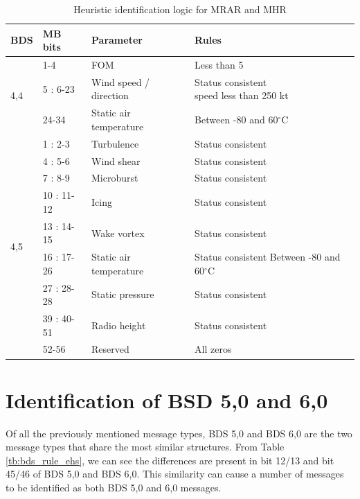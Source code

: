 \begin{table}
\footnotesize
\centering
\small
\caption{Heuristic identification logic for MRAR and MHR}
\label{tb:bds_rule_mrar}
\begin{tabular}{|l|l|l|l|}
\hline
\textbf{BDS} & \textbf{MB bits} & \textbf{Parameter} & \textbf{Rules} \\ \hline \hline
\multirow{3}{*}{4,4} & 1-4 & FOM & Less than 5 \\ \cline{2-4} 
& 5 : 6-23 & Wind speed / direction & \makecell*{Status consistent \\ speed less than 250 kt} \\ \cline{2-4} 
& 24-34 & Static air temperature & Between -80 and 60$^\circ$C \\ \hline \hline
\multirow{9}{*}{4,5} & 1 : 2-3 & Turbulence & Status consistent \\ \cline{2-4} 
& 4 : 5-6 & Wind shear & Status consistent \\ \cline{2-4} 
& 7 : 8-9 & Microburst & Status consistent \\ \cline{2-4} 
& 10 : 11-12 & Icing & Status consistent \\ \cline{2-4} 
& 13 : 14-15 & Wake vortex & Status consistent \\ \cline{2-4} 
& 16 : 17-26 & Static air temperature & \makecell*{Status consistent \\ Between -80 and 60$^\circ$C} \\ \cline{2-4} 
& 27 : 28-28 & Static pressure & Status consistent \\ \cline{2-4} 
& 39 : 40-51 & Radio height & Status consistent \\ \cline{2-4} 
& 52-56 & Reserved & All zeros \\ \hline
\end{tabular}
\end{table}




\section{Identification of BSD 5,0 and 6,0}

Of all the previously mentioned message types, BDS 5,0 and BDS 6,0 are the two message types that share the most similar structures. From Table \ref{tb:bds_rule_ehs}, we can see the differences are present in bit 12/13 and bit 45/46 of BDS 5,0 and BDS 6,0. This similarity can cause a number of messages to be identified as both BDS 5,0 and 6,0 messages.

